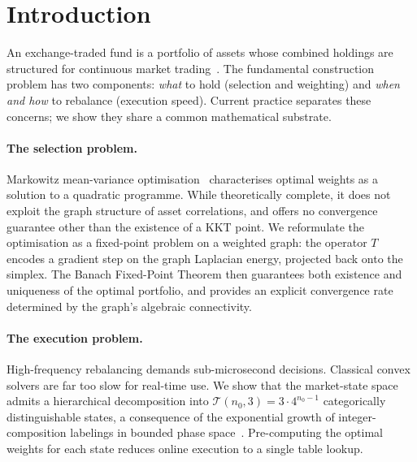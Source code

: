 \documentclass[twocolumn,11pt,a4paper]{article}
\theoremstyle{remark}
\newcommand{\T}{\mathcal{T}}
\begin{document}
\section{Introduction}
\label{sec:intro}

An exchange-traded fund is a portfolio of assets whose combined holdings are
structured for continuous market trading~\cite{gastineau2002}.
The fundamental construction problem has two components: \emph{what} to hold
(selection and weighting) and \emph{when and how} to rebalance (execution speed).
Current practice separates these concerns; we show they share a common mathematical
substrate.

\paragraph{The selection problem.}
Markowitz mean-variance optimisation~\cite{markowitz1952} characterises optimal
weights as a solution to a quadratic programme. While theoretically complete,
it does not exploit the graph structure of asset correlations, and offers no
convergence guarantee other than the existence of a KKT point.
We reformulate the optimisation as a fixed-point problem on a weighted graph:
the operator $T$ encodes a gradient step on the graph Laplacian energy, projected
back onto the simplex. The Banach Fixed-Point Theorem then guarantees both
existence and uniqueness of the optimal portfolio, and provides an explicit
convergence rate determined by the graph's algebraic connectivity.

\paragraph{The execution problem.}
High-frequency rebalancing demands sub-microsecond decisions.
Classical convex solvers are far too slow for real-time use.
We show that the market-state space admits a hierarchical decomposition into
$\T(n_0, 3) = 3 \cdot 4^{n_0-1}$ categorically distinguishable states,
a consequence of the exponential growth of integer-composition labelings in
bounded phase space~\cite{andrews1976}.
Pre-computing the optimal weights for each state reduces online execution to
a single table lookup.
\end{document}
